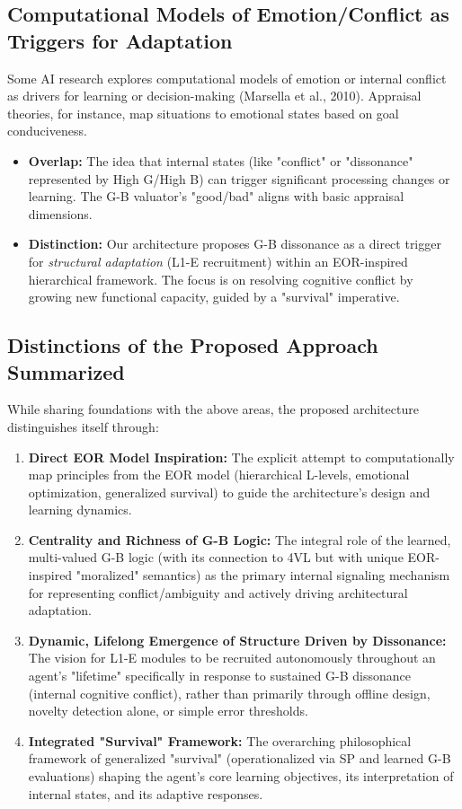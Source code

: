 \documentclass{article}
\begin{document}
\subsection{Computational Models of Emotion/Conflict as Triggers for Adaptation}
Some AI research explores computational models of emotion or internal conflict as drivers for learning or decision-making (Marsella et al., 2010). Appraisal theories, for instance, map situations to emotional states based on goal conduciveness.
\begin{itemize}
    \item \textbf{Overlap:} The idea that internal states (like "conflict" or "dissonance" represented by High G/High B) can trigger significant processing changes or learning. The G-B valuator's "good/bad" aligns with basic appraisal dimensions.
    \item \textbf{Distinction:} Our architecture proposes G-B dissonance as a direct trigger for \textit{structural adaptation} (L1-E recruitment) within an EOR-inspired hierarchical framework. The focus is on resolving cognitive conflict by growing new functional capacity, guided by a "survival" imperative.
\end{itemize}

\subsection{Distinctions of the Proposed Approach Summarized}
While sharing foundations with the above areas, the proposed architecture distinguishes itself through:
\begin{enumerate}
    \item \textbf{Direct EOR Model Inspiration:} The explicit attempt to computationally map principles from the EOR model (hierarchical L-levels, emotional optimization, generalized survival) to guide the architecture's design and learning dynamics.
    \item \textbf{Centrality and Richness of G-B Logic:} The integral role of the learned, multi-valued G-B logic (with its connection to 4VL but with unique EOR-inspired "moralized" semantics) as the primary internal signaling mechanism for representing conflict/ambiguity and actively driving architectural adaptation.
    \item \textbf{Dynamic, Lifelong Emergence of Structure Driven by Dissonance:} The vision for L1-E modules to be recruited autonomously throughout an agent's "lifetime" specifically in response to sustained G-B dissonance (internal cognitive conflict), rather than primarily through offline design, novelty detection alone, or simple error thresholds.
    \item \textbf{Integrated "Survival" Framework:} The overarching philosophical framework of generalized "survival" (operationalized via SP and learned G-B evaluations) shaping the agent's core learning objectives, its interpretation of internal states, and its adaptive responses.
\end{enumerate}
\end{document}
